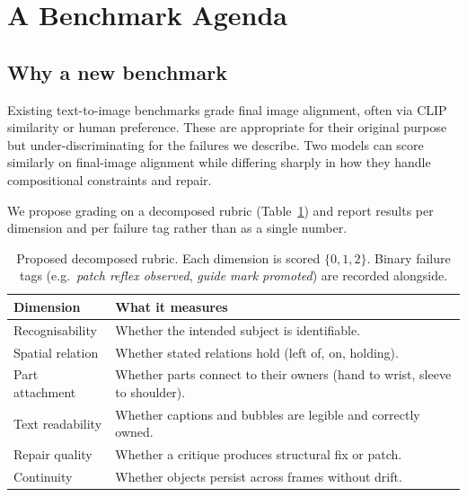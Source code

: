 \documentclass[10pt,twocolumn]{article}
\begin{document}
\section{A Benchmark Agenda}

\subsection{Why a new benchmark}

Existing text-to-image benchmarks
\cite{drawbench,geneval,svgenius,vcode,clipdraw,sketchrnn,sketchy}
grade final image alignment, often via CLIP similarity or human
preference. These are appropriate for their original purpose but
under-discriminating for the failures we describe. Two models can
score similarly on final-image alignment while differing sharply in
how they handle compositional constraints and repair.

We propose grading on a decomposed rubric (Table~\ref{tab:rubric})
and report results per dimension and per failure tag rather than as a
single number.

\begin{table}[t]
  \small
  \centering
  \begin{tabular}{@{}lp{4.6cm}@{}}
    \toprule
    \textbf{Dimension} & \textbf{What it measures} \\
    \midrule
    Recognisability & Whether the intended subject is identifiable. \\
    Spatial relation & Whether stated relations hold (left of, on, holding). \\
    Part attachment & Whether parts connect to their owners (hand to wrist, sleeve to shoulder). \\
    Text readability & Whether captions and bubbles are legible and correctly owned. \\
    Repair quality & Whether a critique produces structural fix or patch. \\
    Continuity & Whether objects persist across frames without drift. \\
    \bottomrule
  \end{tabular}
  \caption{Proposed decomposed rubric. Each dimension is scored
    $\{0,1,2\}$. Binary failure tags (e.g.\ \emph{patch reflex
    observed}, \emph{guide mark promoted}) are recorded alongside.}
  \label{tab:rubric}
\end{table}
\end{document}
